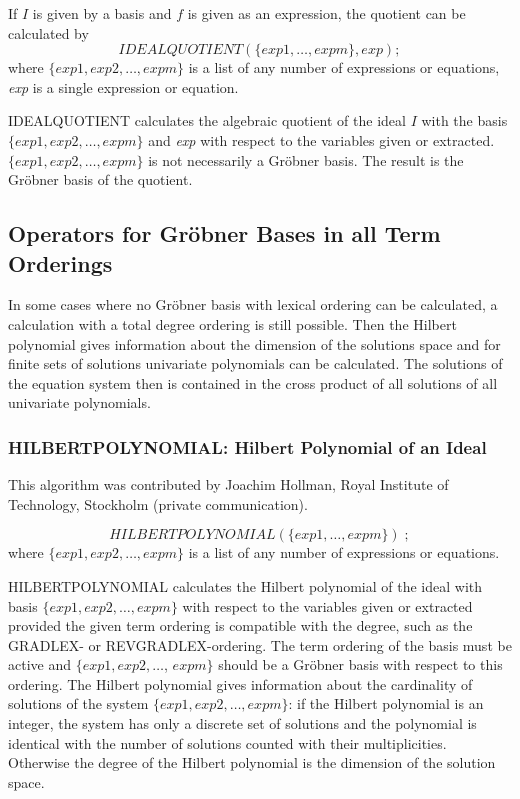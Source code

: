 If $I$ is given by a basis and $f$ is given as an expression, the
quotient can be calculated by
\[
IDEALQUOTIENT (\{exp1, \ldots , expm\}, exp); \]
where $\{exp1, exp2, \ldots , expm\}$ is a list of any number of
expressions or equations, {\it exp} is a single expression or equation.

IDEALQUOTIENT calculates the algebraic quotient of the ideal $I$
with the basis  $\{exp1, exp2, \ldots , expm\}$ and {\it exp} with
respect to  the variables given or extracted.  $\{exp1, exp2, \ldots ,
expm\}$ is not necessarily a Gr\"obner basis.
The result is the Gr\"obner basis of
the quotient.

\subsection{Operators for Gr\"obner Bases in all Term Orderings}
In some cases where no Gr\"obner
basis with lexical ordering can be calculated, a calculation with a total
degree ordering is still possible. Then the Hilbert polynomial gives
information about the dimension of the solutions space and for finite
sets of solutions univariate polynomials can be calculated. The solutions
of the equation system then is contained in the cross product of all
solutions of all univariate polynomials.

\subsubsection{HILBERTPOLYNOMIAL: Hilbert Polynomial of an Ideal}
This algorithm was contributed by {\sc Joachim Hollman}, Royal
Institute of Technology, Stockholm (private communication).

\[
HILBERTPOLYNOMIAL (\{exp1, \ldots , expm\})\;;
\]
where $\{exp1, exp2, \ldots , expm\}$ is a list of any number of
expressions or equations.

HILBERTPOLYNOMIAL calculates the Hilbert polynomial of the ideal
with basis $\{exp1, exp2, \ldots , expm\}$ with respect to the
variables given or extracted provided the given term ordering is
compatible with the degree, such as the GRADLEX- or REVGRADLEX-ordering.
The term ordering of the basis
must be active and $\{exp1, exp2,\ldots$, $ expm\}$ should be a
Gr\"obner basis with respect to this ordering. The Hilbert polynomial
gives information about the cardinality of solutions of the system
$\{exp1, exp2, \ldots , expm\}$: if the Hilbert polynomial is an
integer, the system has only a discrete set of solutions and the
polynomial is identical with the number of solutions counted with
their multiplicities. Otherwise the degree of the Hilbert
polynomial is the dimension of the solution space.

